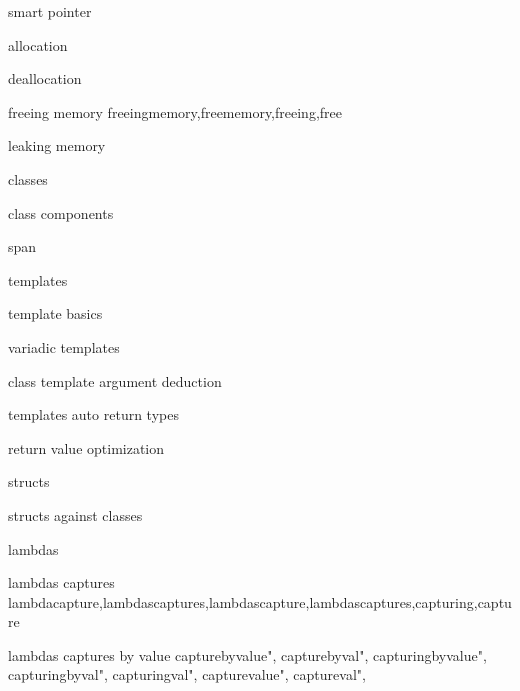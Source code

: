          smart pointer
        
         allocation 
        
         deallocation 
        
         freeing memory 
        freeingmemory,freememory,freeing,free 
        
         leaking memory 
        
         classes 
        
         class components 
        
         span 
        
         templates
        
         template basics 
        
         variadic templates
        
         class template argument deduction 
        
         templates auto return types 
        
         return value optimization 
        
         structs 
        
         structs against classes 
        
         lambdas
        
         lambdas captures
        lambdacapture,lambdascaptures,lambdascapture,lambdascaptures,capturing,capture
        
         lambdas captures by value
        capturebyvalue",  
        capturebyval",  
        capturingbyvalue",  
        capturingbyval",  
        capturingval",  
        capturevalue",  
        captureval",  
        
